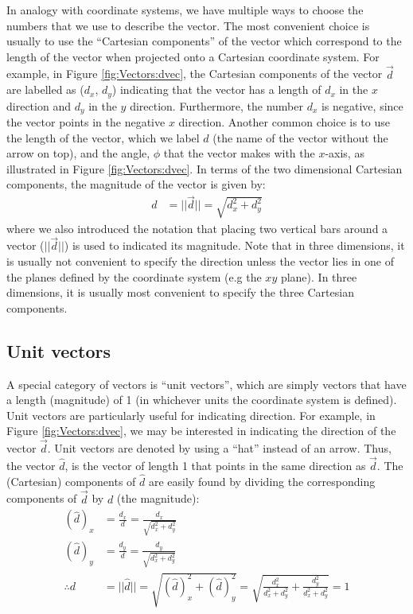 In analogy with coordinate systems, we have multiple ways to choose the numbers that we use to describe the vector. The most convenient choice is usually to use the ``Cartesian components'' of the vector which correspond to the length of the vector when projected onto a Cartesian coordinate system. For example, in Figure \ref{fig:Vectors:dvec}, the Cartesian components of the vector $\vec d$ are labelled as ($d_x$, $d_y$) indicating that the vector has a length of $d_x$ in the $x$ direction and $d_y$ in the $y$ direction. Furthermore, the number $d_x$ is negative, since the vector points in the negative $x$ direction. Another common choice is to use the length of the vector, which we label $d$ (the name of the vector without the arrow on top), and the angle, $\phi$ that the vector makes with the $x$-axis, as illustrated in Figure \ref{fig:Vectors:dvec}. In terms of the two dimensional Cartesian components, the magnitude of the vector is given by:
\begin{align*}
d&= ||\vec d||= \sqrt{d_x^2+d_y^2}
\end{align*}
where we also introduced the notation that placing two vertical bars around a vector ($||\vec d||$) is used to indicated its magnitude. Note that in three dimensions, it is usually not convenient to specify the direction unless the vector lies in one of the planes defined by the coordinate system (e.g the $xy$ plane). In three dimensions, it is usually most convenient to specify the three Cartesian components.


\subsection{Unit vectors} 
A special category of vectors is ``unit vectors'', which are simply vectors that have a length (magnitude) of 1 (in whichever units the coordinate system is defined). Unit vectors are particularly useful for indicating direction. For example, in Figure \ref{fig:Vectors:dvec}, we may be interested in indicating the direction of the vector $\vec d$. Unit vectors are denoted by using a ``hat'' instead of an arrow. Thus, the vector $\hat d$, is the vector of length 1 that points in the same direction as $\vec d$. The (Cartesian) components of $\hat d$ are easily found by dividing the corresponding components of $\vec d$ by $d$ (the magnitude):
\begin{align*}
(\hat d)_x &= \frac{d_x}{d}=\frac{d_x}{\sqrt{d_x^2+d_y^2}}\\
(\hat d)_y &= \frac{d_y}{d}=\frac{d_y}{\sqrt{d_x^2+d_y^2}}\\
\therefore d &= ||\hat d||=\sqrt{(\hat d)_x^2+(\hat d)_y^2}=\sqrt{\frac{d_x^2}{d_x^2+d_y^2}+\frac{d_y^2}{d_x^2+d_y^2}}=1
\end{align*}

